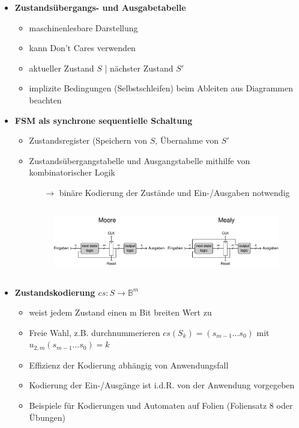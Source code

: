 \documentclass[11pt,a4paper]{article}
\begin{document}
\begin{itemize}
\begin{itemize}
\begin{itemize}
	\end{itemize}
	
\item \textbf{Zustandsübergangs- und Ausgabetabelle}
	\begin{itemize}
	\item maschinenlesbare Darstellung
	\item kann Don't Cares verwenden
	\item aktueller Zustand $S$ | nächster Zustand $S'$
	\item implizite Bedingungen (Selbstschleifen) beim Ableiten aus Diagrammen beachten
	\end{itemize}
	
\item \textbf{FSM als synchrone sequentielle Schaltung}
	\begin{itemize}
	\item Zustandsregister (Speichern von $S$, Übernahme von $S'$
	\item Zustandsübergangstabelle und Ausgangstabelle mithilfe von kombinatorischer Logik
		\begin{itemize}
		\item[$\rightarrow$] binäre Kodierung der Zustände und Ein-/Ausgaben notwendig
		\end{itemize}
		
	\item[] \begin{figure}[H]
				\begin{center}
				\includegraphics[height=3cm]{fsmsequentiell}
				\end{center}
			\end{figure}
	\end{itemize}
	
\item \textbf{Zustandskodierung $cs: S \rightarrow \mathbb{B}^m$}
	\begin{itemize}
	\item weist jedem Zustand einen m Bit breiten Wert zu
	\item Freie Wahl, z.B. durchnummerieren $cs(S_k)=(s_{m-1}...s_0)$ mit $u_{2,m}(s_{m-1}...s_0)=k$
	\item Effizienz der Kodierung abhängig von Anwendungsfall
	\item Kodierung der Ein-/Ausgänge ist i.d.R. von der Anwendung vorgegeben
	\item Beispiele für Kodierungen und Automaten auf Folien (Foliensatz 8 oder Übungen)
	\end{itemize}



\end{itemize}
\end{itemize}
\end{document}
